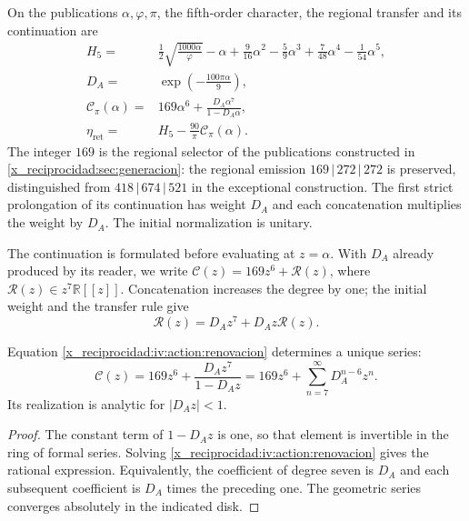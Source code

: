 \begin{definition}
\label{x_reciprocidad:iv:action:lectores}
On the publications \(\alpha,\varphi,\pi\), the fifth-order
character, the regional transfer and its continuation are
\begin{align}
 H_5={}&\frac12\sqrt{\frac{1000\alpha}{\varphi}}-\alpha
       +\frac9{16}\alpha^2-\frac59\alpha^3
       +\frac7{48}\alpha^4-\frac1{54}\alpha^5,
       \label{x_reciprocidad:iv:action:h5}\\
 D_A={}&\exp\!\left(-\frac{100\pi\alpha}{9}\right),
       \label{x_reciprocidad:iv:action:da}\\
 \mathcal C_\pi(\alpha)={}&169\alpha^6+
       \frac{D_A\alpha^7}{1-D_A\alpha},
       \label{x_reciprocidad:iv:action:cpi}\\
 \eta_{\mathrm{ret}}={}&H_5-\frac{90}{\pi}\mathcal C_\pi(\alpha).
       \label{x_reciprocidad:iv:action:eta-ret}
\end{align}
The integer \(169\) is the regional selector of the publications
constructed in \ref{x_reciprocidad:sec:generacion}: the regional emission
\(169\,|\,272\,|\,272\) is preserved, distinguished from
\(418\,|\,674\,|\,521\) in the exceptional construction.
The first strict prolongation of its continuation
has weight \(D_A\) and each concatenation multiplies the weight by
\(D_A\). The initial normalization is unitary.
\end{definition}

The continuation is formulated before evaluating at \(z=\alpha\).
With \(D_A\) already produced by its reader, we write
\(\mathscr C(z)=169z^6+\mathscr R(z)\), where
\(\mathscr R(z)\in z^7\mathbb R[[z]]\).
Concatenation increases the degree by one; the initial weight
and the transfer rule give
\begin{equation}
 \mathscr R(z)=D_Az^7+D_Az\mathscr R(z).
 \label{x_reciprocidad:iv:action:renovacion}
\end{equation}

\begin{proposition}
\label{x_reciprocidad:iv:action:unicidad-renovacion}
Equation \eqref{x_reciprocidad:iv:action:renovacion} determines a unique series:
\begin{equation}
 \mathscr C(z)=169z^6+\frac{D_Az^7}{1-D_Az}
             =169z^6+\sum_{n=7}^{\infty}D_A^{n-6}z^n.
 \label{x_reciprocidad:iv:action:serie-renovacion}
\end{equation}
Its realization is analytic for \(|D_Az|<1\).
\end{proposition}
\begin{proof}
The constant term of \(1-D_Az\) is one, so that
element is invertible in the ring of formal series.
Solving \eqref{x_reciprocidad:iv:action:renovacion} gives the rational expression.
Equivalently, the coefficient of degree seven is \(D_A\) and each
subsequent coefficient is \(D_A\) times the preceding one. The geometric
series converges absolutely in the indicated disk.
\end{proof}

